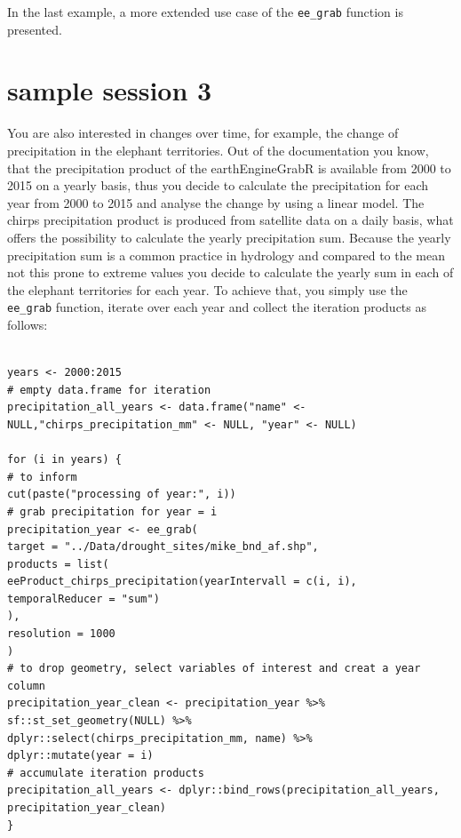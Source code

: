 In the last example, a more extended use case of the \texttt{ee\_grab} function is presented.


\section{sample session 3}

You are also interested in changes over time, for example, the change of precipitation in the elephant territories. Out of the documentation you know, that the precipitation product of the earthEngineGrabR is available from 2000 to 2015 on a yearly basis, thus you decide to calculate the precipitation for each year from 2000 to 2015 and analyse the change by using a linear model. The chirps precipitation product is produced from satellite data on a daily basis, what offers the possibility to calculate the yearly precipitation sum. Because the yearly precipitation sum is a common practice in hydrology and compared to the mean not this prone to extreme values you decide to calculate the yearly sum in each of the elephant territories for each year. To achieve that, you simply use the \texttt{ee\_grab} function, iterate over each year and collect the iteration products as follows:

\begin{lstlisting}

years <- 2000:2015
# empty data.frame for iteration
precipitation_all_years <- data.frame("name" <- NULL,"chirps_precipitation_mm" <- NULL, "year" <- NULL)

for (i in years) {
# to inform
cut(paste("processing of year:", i))
# grab precipitation for year = i
precipitation_year <- ee_grab(
target = "../Data/drought_sites/mike_bnd_af.shp",
products = list(
eeProduct_chirps_precipitation(yearIntervall = c(i, i), temporalReducer = "sum")
),
resolution = 1000
)
# to drop geometry, select variables of interest and creat a year column
precipitation_year_clean <- precipitation_year %>% 
sf::st_set_geometry(NULL) %>% 
dplyr::select(chirps_precipitation_mm, name) %>% 
dplyr::mutate(year = i)
# accumulate iteration products
precipitation_all_years <- dplyr::bind_rows(precipitation_all_years, precipitation_year_clean)
}
\end{lstlisting}




